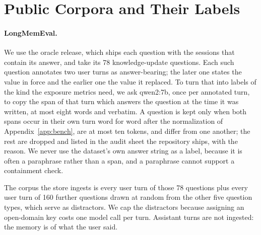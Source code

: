 \documentclass{article} %
\begin{document}
\section{Public Corpora and Their Labels}
\label{app:real}

\paragraph{LongMemEval.} We use the oracle release, which ships each question with the sessions that contain its answer, and take its 78 knowledge-update questions. Each such question annotates two user turns as answer-bearing; the later one states the value in force and the earlier one the value it replaced. To turn that into labels of the kind the exposure metrics need, we ask qwen2:7b, once per annotated turn, to copy the span of that turn which answers the question at the time it was written, at most eight words and verbatim. A question is kept only when both spans occur in their own turn word for word after the normalization of Appendix~\ref{app:bench}, are at most ten tokens, and differ from one another; the rest are dropped and listed in the audit sheet the repository ships, with the reason. We never use the dataset's own answer string as a label, because it is often a paraphrase rather than a span, and a paraphrase cannot support a containment check.

The corpus the store ingests is every user turn of those 78 questions plus every user turn of 160 further questions drawn at random from the other five question types, which serve as distractors. We cap the distractors because assigning an open-domain key costs one model call per turn. Assistant turns are not ingested: the memory is of what the user said.
\end{document}
